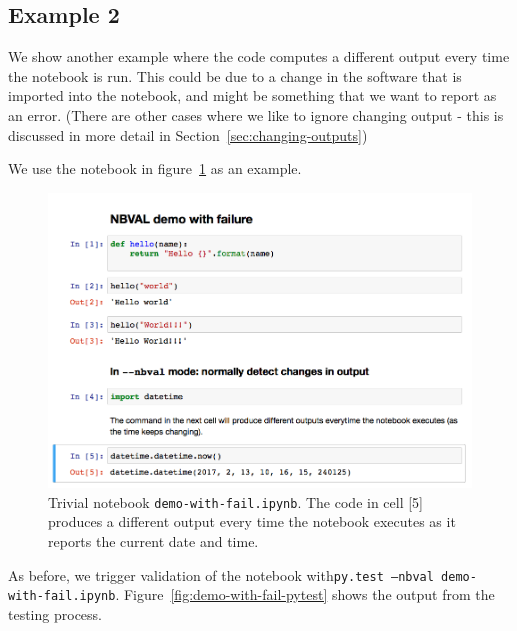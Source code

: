 \documentclass{deliverablereport}
\begin{document}
\subsection{Example 2}
We show another example where the code computes a different output
every time the notebook is run. This could be due to a change in the
software that is imported into the notebook, and might be something
that we want to report as an error. (There are other cases where we
like to ignore changing output - this is discussed in more detail in Section~\ref{sec:changing-outputs})

We use the notebook in figure~\ref{fig:demo-with-fail-ipynb} as an
example.

\begin{figure}[ht]
  \centering
  \includegraphics[width=1\textwidth]{examples/demo-with-fail.png}
  \caption{Trivial notebook \texttt{demo-with-fail.ipynb}. The code in
    cell [5] produces a different output every time the notebook
    executes as it reports the current date and time. \label{fig:demo-with-fail-ipynb}}
\end{figure}

As before, we trigger validation of the notebook with\linebreak \texttt{py.test --nbval demo-with-fail.ipynb}. Figure~\ref{fig:demo-with-fail-pytest} shows the output
from the testing process.
\end{document}
